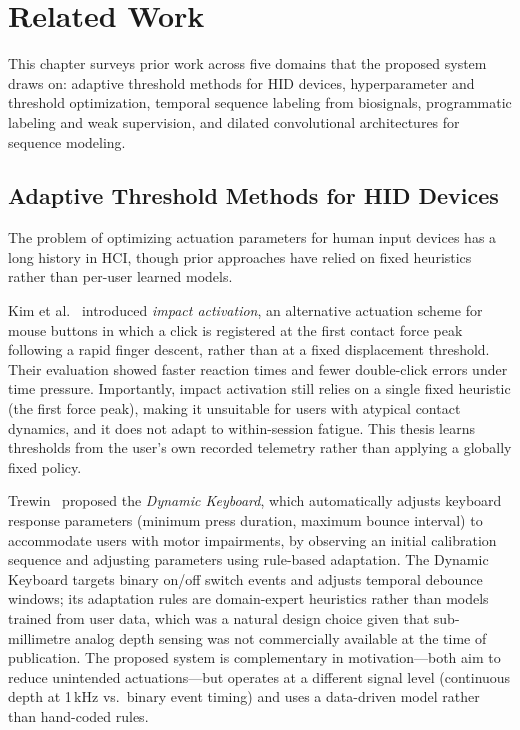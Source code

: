 \chapter{Related Work}

This chapter surveys prior work across five domains that the proposed system draws on: adaptive threshold methods for HID devices, hyperparameter and threshold optimization, temporal sequence labeling from biosignals, programmatic labeling and weak supervision, and dilated convolutional architectures for sequence modeling.

\section{Adaptive Threshold Methods for HID Devices}

The problem of optimizing actuation parameters for human input devices has a long history in HCI, though prior approaches have relied on fixed heuristics rather than per-user learned models.

Kim et al.~\cite{impact2018} introduced \emph{impact activation}, an alternative actuation scheme for mouse buttons in which a click is registered at the first contact force peak following a rapid finger descent, rather than at a fixed displacement threshold. Their evaluation showed faster reaction times and fewer double-click errors under time pressure. Importantly, impact activation still relies on a single fixed heuristic (the first force peak), making it unsuitable for users with atypical contact dynamics, and it does not adapt to within-session fatigue. This thesis learns thresholds from the user's own recorded telemetry rather than applying a globally fixed policy.

Trewin~\cite{dynamic_keyboard} proposed the \emph{Dynamic Keyboard}, which automatically adjusts keyboard response parameters (minimum press duration, maximum bounce interval) to accommodate users with motor impairments, by observing an initial calibration sequence and adjusting parameters using rule-based adaptation. The Dynamic Keyboard targets binary on/off switch events and adjusts temporal debounce windows; its adaptation rules are domain-expert heuristics rather than models trained from user data, which was a natural design choice given that sub-millimetre analog depth sensing was not commercially available at the time of publication. The proposed system is complementary in motivation---both aim to reduce unintended actuations---but operates at a different signal level (continuous depth at 1\,kHz vs.\ binary event timing) and uses a data-driven model rather than hand-coded rules.

